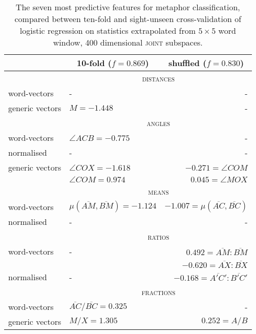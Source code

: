 \begin{table}
\centering
\begin{tabular}{llr}
\hline
& \multicolumn{1}{c}{10-fold ($f = 0.869$)} & \multicolumn{1}{c}{shuffled ($f = 0.830$)} \\
\hline
& \multicolumn{2}{c}{\textsc{distances}} \\
word-vectors& - & - \\
generic vectors & $M = -1.448$ & - \\
\hline
& \multicolumn{2}{c}{\textsc{angles}} \\
word-vectors & $\angle ACB = -0.775$ & - \\
normalised & - & - \\
generic vectors & $\angle COX = -1.618$ & $-0.271 = \angle COM$  \\
& $\angle COM = 0.974$ & $0.045 = \angle MOX$ \\
\hline
& \multicolumn{2}{c}{\textsc{means}} \\
word-vectors & $\mu(\overline{AM},\overline{BM}) = -1.124$ & $-1.007 = \mu(\overline{AC},\overline{BC})$ \\
normalised & - & - \\
\hline
& \multicolumn{2}{c}{\textsc{ratios}} \\
word-vectors & - & $0.492 = \overline{AM}:\overline{BM}$ \\
& & $-0.620 = \overline{AX}:\overline{BX}$ \\
normalised & - & $-0.168 = \overline{A'C'}:\overline{B'C'}$ \\
\hline
& \multicolumn{2}{c}{\textsc{fractions}} \\
word-vectors & $\overline{AC}/\overline{BC} = 0.325$ & - \\
generic vectors & $M/X = 1.305$ & $0.252 = A/B$ \\
\hline
\end{tabular}
\caption[Most Predictive Feature Vectors for Metaphor Classification]{The seven most predictive features for metaphor classification, compared between ten-fold and sight-unseen cross-validation of logistic regression on statistics extrapolated from $5 \times 5$ word window, 400 dimensional \textsc{joint} subspaces.}
\label{tab:metatures}
\end{table}

